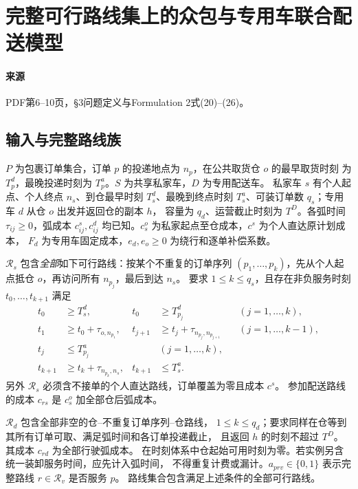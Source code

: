 \documentclass[UTF8,11pt]{ctexart}
\begin{document}
\section*{完整可行路线集上的众包与专用车联合配送模型}

\paragraph{来源} PDF第6--10页，§3问题定义与Formulation 2式(20)--(26)。
\subsection*{输入与完整路线族}
$P$ 为包裹订单集合，订单 $p$ 的投递地点为 $n_p$，在公共取货仓 $o$ 的最早取货时刻
为 $T_p^d$，最晚投递时刻为 $T_p^a$。$S$ 为共享私家车，$D$ 为专用配送车。
私家车 $s$ 有个人起点、个人终点 $n_s$、到仓最早时刻 $T_s^d$、最晚到终点时刻
$T_s^a$、可装订单数 $q_s$；专用车 $d$ 从仓 $o$ 出发并返回仓的副本 $h$，
容量为 $q_d$、运营截止时刻为 $T^D$。各弧时间 $\tau_{ij}\ge0$，弧成本
$c^s_{ij},c^d_{ij}$ 均已知。$c_s^o$ 为私家起点至仓成本，$c^s$ 为个人直达原计划成本，
$F_d$ 为专用车固定成本，$e_d,e_o\ge0$ 为绕行和逐单补偿系数。

$\mathcal R_s$ 包含\emph{全部}如下可行路线：按某个不重复的订单序列
$(p_1,\ldots,p_k)$，先从个人起点抵仓 $o$，再访问所有 $n_{p_j}$，最后到达 $n_s$。
要求 $1\le k\le q_s$，且存在非负服务时刻 $t_0,\ldots,t_{k+1}$ 满足
\begin{align*}
t_0&\ge T_s^d,&t_0&\ge T_{p_j}^d &&(j=1,\ldots,k),\\
t_1&\ge t_0+\tau_{o,n_{p_1}},&
t_{j+1}&\ge t_j+\tau_{n_{p_j},n_{p_{j+1}}}&&(j=1,\ldots,k-1),\\
t_j&\le T_{p_j}^a&&(j=1,\ldots,k),\\
t_{k+1}&\ge t_k+\tau_{n_{p_k},n_s},&
t_{k+1}&\le T_s^a.
\end{align*}
另外 $\mathcal R_s$ 必须含不接单的个人直达路线，订单覆盖为零且成本 $c^s$。
参加配送路线的成本 $c_{rs}$ 是 $c_s^o$ 加全部仓后弧成本。

$\mathcal R_d$ 包含全部非空的仓--不重复订单序列--仓路线，
$1\le k\le q_d$；要求同样在仓等到其所有订单可取、满足弧时间和各订单投递截止，
且返回 $h$ 的时刻不超过 $T^D$。其成本 $c_{rd}$ 为全部行驶弧成本。
在时刻体系中仓起始可用时刻为零。若实例另含统一装卸服务时间，应先计入弧时间，
不得重复计费或漏计。$a_{prv}\in\{0,1\}$ 表示完整路线 $r\in\mathcal R_v$ 是否服务 $p$。
路线集合包含满足上述条件的全部可行路线。
\end{document}

